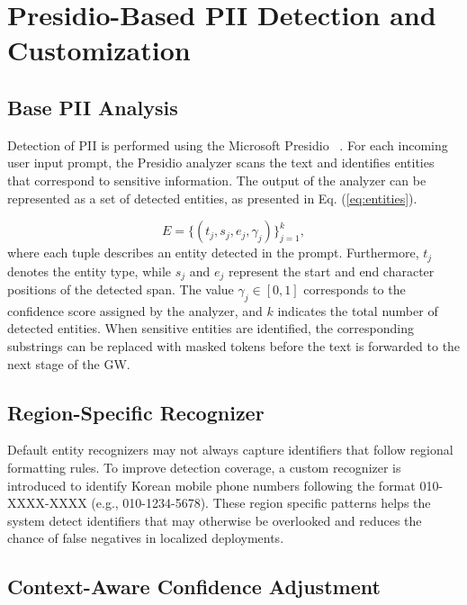 \documentclass[conference]{IEEEtran}
\begin{document}
\section{Presidio-Based PII Detection and Customization}
\label{sec:piidetection}

\subsection{Base PII Analysis}

Detection of PII is performed using the Microsoft Presidio ~\cite{presidio2023}. For each incoming user input prompt, the Presidio analyzer scans the text and identifies entities that correspond to sensitive information. The output of the analyzer can be represented as a set of detected entities, as presented in Eq. (\ref{eq:entities}).

\begin{equation}
E = \{(t_j, s_j, e_j, \gamma_j)\}_{j=1}^{k},
\label{eq:entities}
\end{equation}
where each tuple describes an entity detected in the prompt. Furthermore, $t_j$ denotes the entity type, while $s_j$ and $e_j$ represent the start and end character positions of the detected span. The value $\gamma_j \in [0,1]$ corresponds to the confidence score assigned by the analyzer, and $k$ indicates the total number of detected entities. When sensitive entities are identified, the corresponding substrings can be replaced with masked tokens before the text is forwarded to the next stage of the GW.

\subsection{Region-Specific Recognizer}

Default entity recognizers may not always capture identifiers that follow regional formatting rules. To improve detection coverage, a custom recognizer is introduced to identify Korean mobile phone numbers following the format 010-XXXX-XXXX (e.g., 010-1234-5678). These region specific patterns helps the system detect identifiers that may otherwise be overlooked and reduces the chance of false negatives in localized deployments.

\subsection{Context-Aware Confidence Adjustment}
\end{document}
